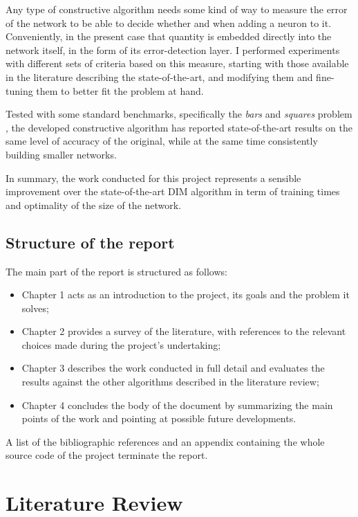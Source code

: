 \documentclass[11pt,a4paper]{report}
\begin{document}
			Any type of constructive algorithm needs some kind of way to measure the error of the network to be able to decide whether and when adding a neuron to it. Conveniently, in the present case that quantity is embedded directly into the network itself, in the form of its error-detection layer. I performed experiments with different sets of criteria based on this measure, starting with those available in the literature describing the state-of-the-art, and modifying them and fine-tuning them to better fit the problem at hand.
		
			Tested with some standard benchmarks, specifically the \emph{bars} \cite{spratling2012unsupervised} and \emph{squares} problem \cite{spratling2009unsupervised}, the developed constructive algorithm has reported state-of-the-art results on the same level of accuracy of the original, while at the same time consistently building smaller networks.
		
			In summary, the work conducted for this project represents a sensible improvement over the state-of-the-art DIM algorithm in term of training times and optimality of the size of the network.

		\section{Structure of the report}
			The main part of the report is structured as follows:
			\begin{itemize}
				\item Chapter 1 acts as an introduction to the project, its goals and the problem it solves;
				\item Chapter 2 provides a survey of the literature, with references to the relevant choices made during the project's undertaking;
				\item Chapter 3 describes the work conducted in full detail and evaluates the results against the other algorithms described in the literature review;
				\item Chapter 4 concludes the body of the document by summarizing the main points of the work and pointing at possible future developments.
			\end{itemize}
			A list of the bibliographic references and an appendix containing the whole source code of the project terminate the report.
	
	
	\chapter{Literature Review}
\end{document}

